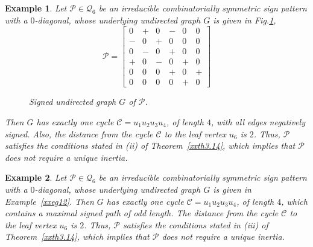 \documentclass[a4paper, 10pt]{article}
\newtheorem{eg}{Example}[section]
\numberwithin{equation}{section}
\begin{document}
\begin{eg}
	Let $\mathcal{P}\in \mathcal{Q}_6$ be an irreducible combinatorially symmetric sign pattern with a $0$-diagonal, whose underlying undirected graph $G$ is  given in Fig.\ref{xnfig4.2},
	\[
	\mathcal{P} =
	\begin{bmatrix}
		0 & + & 0 & - & 0 & 0 \\
		- & 0 & + & 0 & 0 & 0 \\
		0 & - & 0 & + & 0 & 0 \\
		+ & 0 & - & 0 & + & 0 \\
		0 & 0 & 0 & + & 0 & + \\
		0 & 0 & 0 & 0 & + & 0
	\end{bmatrix}
	\]
	
	\begin{figure}[H]
		\centering
		\tikzset{node distance=1cm}
		\caption{Signed undirected graph $G$ of $\mathcal{P}$.}
		\label{xnfig4.2}
	\end{figure}
	Then $G$ has exactly one cycle $\mathcal{C}=u_1u_2u_3u_4$, of length $4$, with all edges negatively signed. Also, the distance from the cycle $\mathcal{C}$ to the leaf vertex $u_6$ is $2$. Thus, $\mathcal{P}$ satisfies the conditions stated in (ii) of Theorem~\ref{xxth3.14}, which implies that $\mathcal{P}$ does not require a unique inertia.
\end{eg}






\begin{eg}
	Let $\mathcal{P}\in \mathcal{Q}_6$ be an irreducible combinatorially symmetric sign pattern with a $0$-diagonal, whose underlying undirected graph $G$ is given in Example~\ref{xxeg12}.
	Then $G$ has exactly one cycle $\mathcal{C}=u_1u_2u_3u_4$, of length $4$, which contains a maximal signed path of odd length. The distance from the cycle $\mathcal{C}$ to the leaf vertex $u_6$ is $2$. Thus, $\mathcal{P}$ satisfies the conditions stated in (iii) of Theorem~\ref{xxth3.14}, which implies that $\mathcal{P}$ does not require a unique inertia.
\end{eg}
\end{document}

